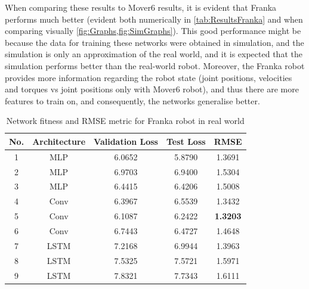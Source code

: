 When comparing these results to Mover6 results, it is evident that Franka performs much better (evident both numerically in \cref{tab:ResultsFranka} and when comparing visually \cref{fig:Graphs,fig:SimGraphs}). This good performance might be because the data for training these networks were obtained in simulation, and the simulation is only an approximation of the real world, and it is expected that the simulation performs better than the real-world robot. Moreover, the Franka robot provides more information regarding the robot state (joint positions, velocities and torques vs joint positions only with Mover6 robot), and thus there are more features to train on, and consequently, the networks generalise better.

\begin{table}
    \caption[Network fitness and RMSE metric for Franka robot (real world)]{Network fitness and RMSE metric for Franka robot in real world}
    \label{tab:ResultsFrankaReal}
    \centering
    \begin{tabular}{ccccc}
        \toprule
        \textbf{No.} & \textbf{Architecture} & \textbf{Validation Loss} & \textbf{Test Loss} & \textbf{RMSE} \\
        \midrule
        1 & MLP & 6.0652 & 5.8790 & 1.3691 \\ %
        2 & MLP & 6.9703 & 6.9400 & 1.5304   \\ %
        3 & MLP & 6.4415 & 6.4206 & 1.5008 \\ %
        4 & Conv & 6.3967 & 6.5539 & 1.3432 \\ %
        5 & Conv & 6.1087 & 6.2422 & \textbf{1.3203} \\ %
        6 & Conv & 6.7443 & 6.4727 & 1.4648 \\ %
        7 & LSTM & 7.2168 & 6.9944 & 1.3963 \\ %
        8 & LSTM & 7.5325 & 7.5721 & 1.5971 \\ %
        9 & LSTM & 7.8321 & 7.7343 & 1.6111 \\ %
        \bottomrule
    \end{tabular}
\end{table}

